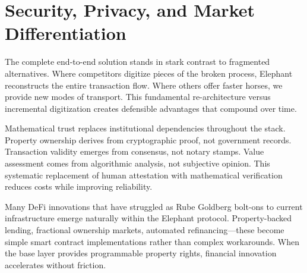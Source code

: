 \section{Security, Privacy, and Market Differentiation}

The complete end-to-end solution stands in stark contrast to fragmented alternatives. Where competitors digitize pieces of the broken process, Elephant reconstructs the entire transaction flow. Where others offer faster horses, we provide new modes of transport. This fundamental re-architecture versus incremental digitization creates defensible advantages that compound over time.

Mathematical trust replaces institutional dependencies throughout the stack. Property ownership derives from cryptographic proof, not government records. Transaction validity emerges from consensus, not notary stamps. Value assessment comes from algorithmic analysis, not subjective opinion. This systematic replacement of human attestation with mathematical verification reduces costs while improving reliability.

Many DeFi innovations that have struggled as Rube Goldberg bolt-ons to current infrastructure emerge naturally within the Elephant protocol. Property-backed lending, fractional ownership markets, automated refinancing—these become simple smart contract implementations rather than complex workarounds. When the base layer provides programmable property rights, financial innovation accelerates without friction.

